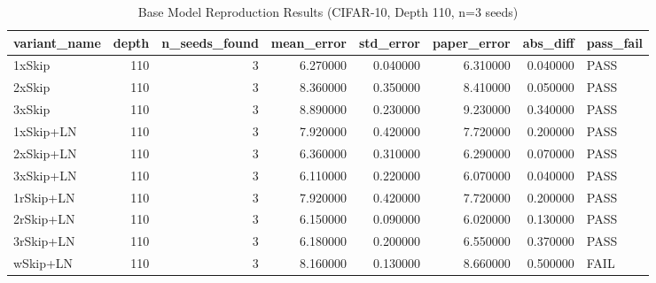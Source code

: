 \begin{table}
\caption{Base Model Reproduction Results (CIFAR-10, Depth 110, n=3 seeds)}
\label{tab:base_table1}
\begin{tabular}{lrrrrrrl}
\toprule
variant_name & depth & n_seeds_found & mean_error & std_error & paper_error & abs_diff & pass_fail \\
\midrule
1xSkip & 110 & 3 & 6.270000 & 0.040000 & 6.310000 & 0.040000 & PASS \\
2xSkip & 110 & 3 & 8.360000 & 0.350000 & 8.410000 & 0.050000 & PASS \\
3xSkip & 110 & 3 & 8.890000 & 0.230000 & 9.230000 & 0.340000 & PASS \\
1xSkip+LN & 110 & 3 & 7.920000 & 0.420000 & 7.720000 & 0.200000 & PASS \\
2xSkip+LN & 110 & 3 & 6.360000 & 0.310000 & 6.290000 & 0.070000 & PASS \\
3xSkip+LN & 110 & 3 & 6.110000 & 0.220000 & 6.070000 & 0.040000 & PASS \\
1rSkip+LN & 110 & 3 & 7.920000 & 0.420000 & 7.720000 & 0.200000 & PASS \\
2rSkip+LN & 110 & 3 & 6.150000 & 0.090000 & 6.020000 & 0.130000 & PASS \\
3rSkip+LN & 110 & 3 & 6.180000 & 0.200000 & 6.550000 & 0.370000 & PASS \\
wSkip+LN & 110 & 3 & 8.160000 & 0.130000 & 8.660000 & 0.500000 & FAIL \\
\bottomrule
\end{tabular}
\end{table}
